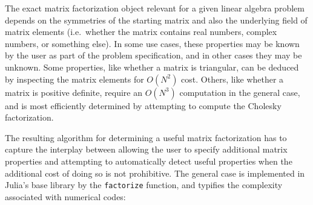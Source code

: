 \documentclass[10pt, preprint]{sigplanconf}
\begin{document}
The exact matrix factorization object relevant for a given linear algebra
problem depends on the symmetries of the starting matrix and also the
underlying field of matrix elements (i.e.\ whether the matrix contains real
numbers, complex numbers, or something else). In some use cases, these
properties may be known by the user as part of the problem specification, and
in other cases they may be unknown. Some properties, like whether a
matrix is triangular, can be deduced by inspecting the matrix elements for
$O(N^2)$ cost. Others, like whether a matrix is positive definite, require an
$O(N^3)$ computation in the general case, and is most efficiently determined by
attempting to compute the Cholesky factorization.

The resulting algorithm for determining a useful matrix factorization has to
capture the interplay between allowing the user to specify additional matrix
properties and attempting to automatically detect useful properties when the
additional cost of doing so is not prohibitive. The general case is implemented
in Julia's base library by the \verb|factorize| function, and typifies the
complexity associated with numerical codes:
\end{document}
